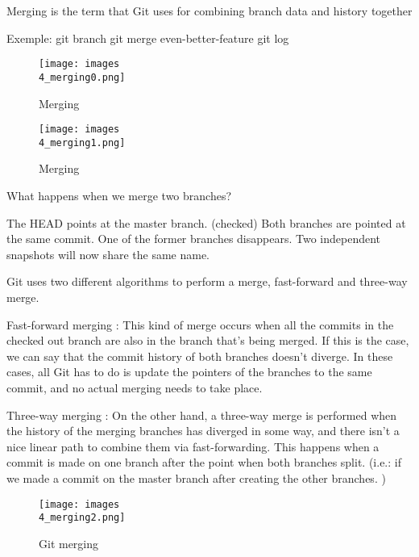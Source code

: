 \documentclass[11pt, onecolumn]{article}
\begin{document}
Merging is the term that Git uses for combining branch data and history together

Exemple:
git branch
git merge even-better-feature
git log

\begin{figure}[h]
\begin{center}
\texttt{[image: images\\4\_merging0.png]}
\end{center}
\caption{Merging}
\label{4_merging0}
\end{figure}

\begin{figure}[h]
\begin{center}
\texttt{[image: images\\4\_merging1.png]}
\end{center}
\caption{Merging}
\label{4_merging1}
\end{figure}

What happens when we merge two branches?

The HEAD points at the master branch.
(checked) Both branches are pointed at the same commit.
One of the former branches disappears.
Two independent snapshots will now share the same name.

Git uses two different algorithms to perform a merge, fast-forward and three-way merge. 

Fast-forward merging :
This kind of merge occurs when all the commits in the checked out branch are also in the branch that's being merged.
If this is the case, we can say that the commit history of both branches doesn't diverge.
In these cases, all Git has to do is update the pointers of the branches to the same commit, and no actual merging needs to take place.

Three-way merging : 
On the other hand, a three-way merge is performed when the history of the merging branches has diverged in some way, and there isn't a nice linear path to combine them via fast-forwarding.
This happens when a commit is made on one branch after the point when both branches split.  (i.e.: if we made a commit on the master branch after creating the other branches. )

\begin{figure}[h]
\begin{center}
\texttt{[image: images\\4\_merging2.png]}
\end{center}
\caption{Git merging}
\label{4_merging2}
\end{figure}
\end{document}

